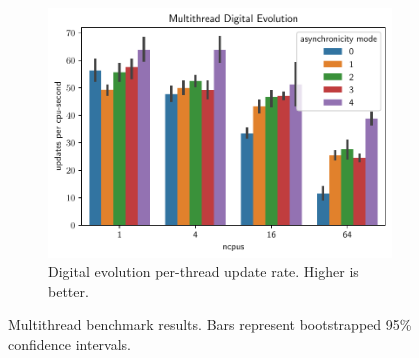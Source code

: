 \begin{figure}[thpb]
    
    \begin{subfigure}[b]{\linewidth}
    \includegraphics[width=\linewidth]{chart/multithread-digital-evolution}
    \caption{Digital evolution per-thread update rate. Higher is better.}
         \label{fig:multithread_digital_evolution_update_rate}
    \end{subfigure}

    \caption{Multithread benchmark results. Bars represent bootstrapped 95\% confidence intervals. }
      \label{fig:multithread_benchmarks}
  \end{figure}